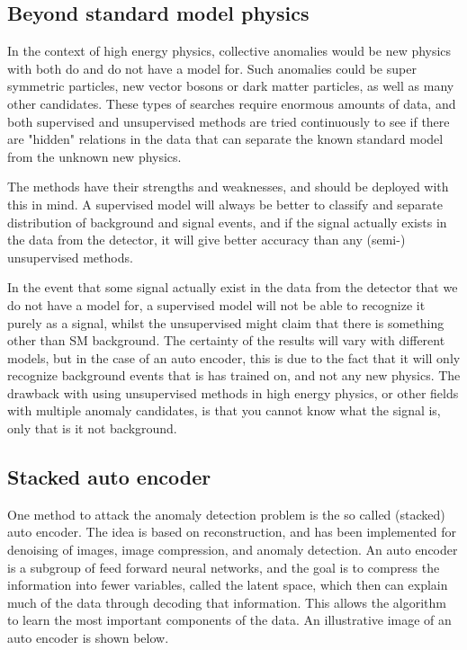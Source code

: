 \documentclass[ reprint, amsmath,amssymb, aps, nofootinbib]{revtex4-2}
\begin{document}
\subsection{Beyond standard model physics}

In the context of high energy physics, collective anomalies would be new physics with both do and do not have a model for. Such anomalies could be super symmetric particles\cite{JMLR:v18:16-558}, new vector bosons or dark matter particles, as well as many other candidates. These types of searches require enormous amounts of data, and both supervised and unsupervised methods are tried continuously to see if there are "hidden" relations in the data that can separate the known standard model from the unknown new physics.\par 
The methods have their strengths and weaknesses, and should be deployed with this in mind. A supervised model will always be better to classify and separate distribution of background and signal events, and if the signal actually exists in the data from the detector, it will give better accuracy than any (semi-) unsupervised methods. \par 
In the event that some signal actually exist in the data from the detector that we do not have a model for, a supervised model will not be able to recognize it purely as a signal, whilst the unsupervised might claim that there is something other than SM background. The certainty of the results will vary with different models, but in the case of an auto encoder, this is due to the fact that it will only recognize background events that is has trained on, and not any new physics. The drawback with using unsupervised methods in high energy physics, or other fields with multiple anomaly candidates, is that you cannot know what the signal is, only that is it not background. \par 



\subsection{Stacked auto encoder}
One method to attack the anomaly detection problem is the so called (stacked) auto encoder. The idea is based on reconstruction, and has been implemented for denoising of images, image compression, and anomaly detection. An auto encoder is a subgroup of feed forward neural networks, and the goal is to compress the information into fewer variables, called the latent space, which then can explain much of the data through decoding that information. This allows the algorithm to learn the most important components of the data. An illustrative image of an auto encoder is shown below. 
\end{document}
